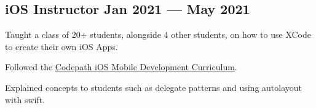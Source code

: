 \subsection{{iOS Instructor \hfill Jan 2021 --- May 2021}}
\begin{zitemize}
\item Taught a class of 20+ students, alongside 4 other students, on how to use XCode to create their own iOS Apps.
\item Followed the \href{https://www.codepath.org/courses/ios-mobile-development}{Codepath iOS Mobile Development Curriculum}.
\item Explained concepts to students such as delegate patterns and using autolayout with swift.
\end{zitemize}

